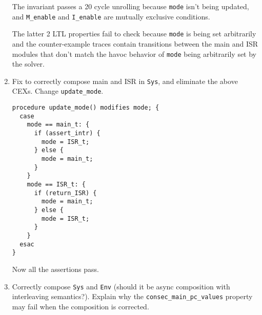 \begin{enumerate}[label=(\alph*)]
    The invariant passes a 20 cycle unrolling because \verb|mode| isn't being updated, and \verb|M_enable| and \verb|I_enable| are mutually exclusive conditions.

    The latter 2 LTL properties fail to check because \verb|mode| is being set arbitrarily and the counter-example traces contain transitions between the main and ISR modules that don't match the havoc behavior of \verb|mode| being arbitrarily set by the solver.

  \item {\color{blue}Fix to correctly compose main and ISR in \verb|Sys|, and eliminate the above CEXs. Change \verb|update_mode|.}

    \begin{verbatim}
procedure update_mode() modifies mode; {
  case
    mode == main_t: {
      if (assert_intr) {
        mode = ISR_t;
      } else {
        mode = main_t;
      }
    }
    mode == ISR_t: {
      if (return_ISR) {
        mode = main_t;
      } else {
        mode = ISR_t;
      }
    }
  esac
}
    \end{verbatim}

    Now all the assertions pass.

  \item {\color{blue} Correctly compose \verb|Sys| and \verb|Env| (should it be async composition with interleaving semantics?). Explain why the \verb|consec_main_pc_values| property may fail when the composition is corrected.}
\end{enumerate}

